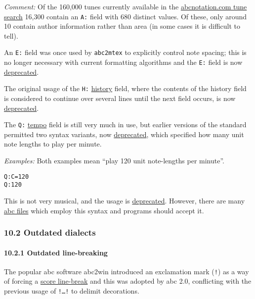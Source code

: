 \emph{Comment:} Of the 160,000 tunes currently available in the
\href{http://abcnotation.com/search}{abcnotation.com tune search} 16,300
contain an \texttt{A:} field with 680 distinct values. Of these, only
around 10 contain author information rather than area (in some cases it
is difficult to tell).

An \texttt{E:} field was once used by \texttt{abc2mtex} to explicitly
control note spacing; this is no longer necessary with current
formatting algorithms and the \texttt{E:} field is now
\protect\hyperlink{outdated_syntax}{deprecated}.

The original usage of the \texttt{H:}
\protect\hyperlink{hhistory}{history} field, where the contents of the
history field is considered to continue over several lines until the
next field occurs, is now
\protect\hyperlink{outdated_syntax}{deprecated}.

The \texttt{Q:} \protect\hyperlink{qtempo}{tempo} field is still very
much in use, but earlier versions of the standard permitted two syntax
variants, now \protect\hyperlink{outdated_syntax}{deprecated}, which
specified how many unit note lengths to play per minute.

\emph{Examples:} Both examples mean ``play 120 unit note-lengths per
minute''.

\begin{verbatim}
Q:C=120
Q:120
\end{verbatim}

This is not very musical, and the usage is
\protect\hyperlink{outdated_syntax}{deprecated}. However, there are many
\protect\hyperlink{abc_file_definition}{abc files} which employ this
syntax and programs should accept it.

\hypertarget{outdated_dialects}{\subsubsection{10.2 Outdated
dialects}\label{outdated_dialects}}

\hypertarget{outdated_line-breaking}{\paragraph{10.2.1 Outdated
line-breaking}\label{outdated_line-breaking}}

The popular abc software abc2win introduced an exclamation mark
(\texttt{!}) as a way of forcing a
\protect\hyperlink{score_line-break_definition}{score line-break} and
this was adopted by abc 2.0, conflicting with the previous usage of
\texttt{!\ldots{}!} to delimit decorations.

